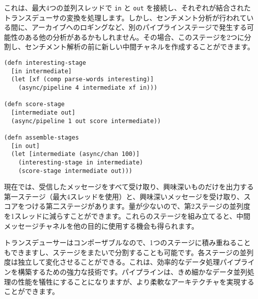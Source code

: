 これは、最大4つの並列スレッドで \texttt{in} と \texttt{out} を接続し、それぞれが結合されたトランスデューサの変換を処理します。しかし、センチメント分析が行われている間に、アーカイブへのロギングなど、別のパイプラインステージで発生する可能性のある他の分析があるかもしれません。その場合、このステージを2つに分割し、センチメント解析の前に新しい中間チャネルを作成することができます。

\begin{lstlisting}[numbers=none]
(defn interesting-stage
  [in intermediate]
  (let [xf (comp parse-words interesting)]
    (async/pipeline 4 intermediate xf in)))

(defn score-stage
  [intermediate out]
  (async/pipeline 1 out score intermediate))

(defn assemble-stages
  [in out]
  (let [intermediate (async/chan 100)]
    (interesting-stage in intermediate)
    (score-stage intermediate out)))
\end{lstlisting}

現在では、受信したメッセージをすべて受け取り、興味深いものだけを出力する第一ステージ（最大4スレッドを使用）と、興味深いメッセージを受け取り、スコアをつける第二ステージがあります。量が少ないので、第2ステージの並列度を1スレッドに減らすことができます。これらのステージを組み立てると、中間メッセージチャネルを他の目的に使用する機会も得られます。

トランスデューサーはコンポーザブルなので、1つのステージに積み重ねることもできますし、ステージをまたいで分割することも可能です。各ステージの並列度は独立して変化させることができる。これは、効率的なデータ処理パイプラインを構築するための強力な技術です。パイプラインは、きめ細かなデータ並列処理の性能を犠牲にすることになりますが、より柔軟なアーキテクチャを実現することができます。


